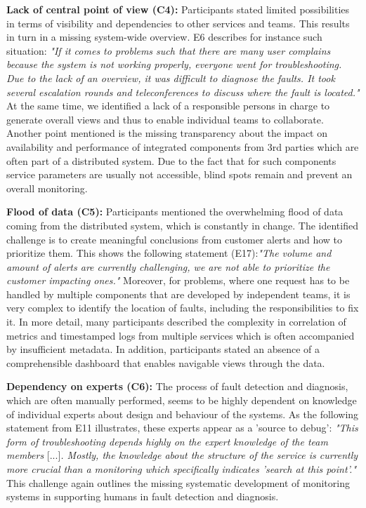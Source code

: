 \documentclass[runningheads]{llncs}
\begin{document}
\textbf{Lack of central point of view (C4):}
Participants stated limited possibilities in terms of visibility and dependencies to other services and teams. This results in turn in a missing system-wide overview. E6 describes for instance such situation: \textit{"If it comes to problems such that there are many user complains because the system is not working properly, everyone went for troubleshooting. Due to the lack of an overview, it was difficult to diagnose the faults. It took several escalation rounds and teleconferences to discuss where the fault is located."} At the same time, we identified a lack of a responsible persons in charge to generate overall views and thus to enable individual teams to collaborate. Another point mentioned is the missing transparency about the impact on availability and performance of integrated components from 3rd parties which are often part of a distributed system. Due to the fact that for such components service parameters are usually not accessible, blind spots remain and prevent an overall monitoring.

\textbf{Flood of data (C5):}
Participants mentioned the overwhelming flood of data coming from the distributed system, which is constantly in change. The identified challenge is to create meaningful conclusions from customer alerts and how to prioritize them. This shows the following statement (E17):\textit{"The volume and amount of alerts are currently challenging, we are not able to prioritize the customer impacting ones."} Moreover, for problems, where one request has to be handled by multiple components that are developed by independent teams, it is very complex to identify the location of faults, including the responsibilities to fix it. In more detail, many participants described the complexity in correlation of metrics and timestamped logs from multiple services which is often accompanied by insufficient metadata. In addition, participants stated an absence of a comprehensible dashboard that enables navigable views through the data.

\textbf{Dependency on experts (C6):}
The process of fault detection and diagnosis, which are often manually performed, seems to be highly dependent on knowledge of individual experts about design and behaviour of the systems. As the following statement from E11 illustrates, these experts appear as a 'source to debug': \textit{"This form of troubleshooting depends highly on the expert knowledge of the team members} [...]\textit{. Mostly, the knowledge about the structure of the service is currently more crucial than a monitoring which specifically indicates 'search at this point'."} This challenge again outlines the missing systematic development of monitoring systems in supporting humans in fault detection and diagnosis.
\end{document}
